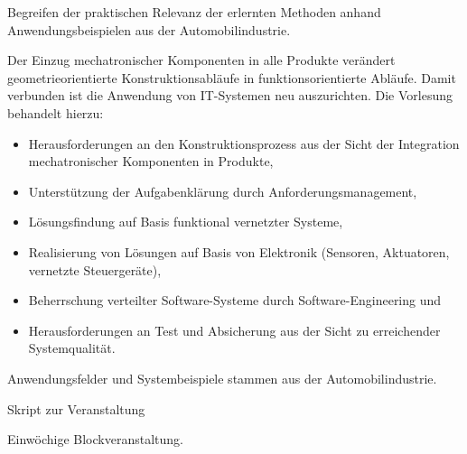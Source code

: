 \begin{course}
\begin{learningoutcomes}
 

Begreifen der praktischen Relevanz der erlernten Methoden anhand Anwendungsbeispielen aus der Automobilindustrie.


\end{learningoutcomes}

\begin{content}
Der Einzug mechatronischer Komponenten in alle Produkte verändert geometrieorientierte Konstruktionsabläufe in funktionsorientierte Abläufe. Damit verbunden ist die Anwendung von IT-Systemen neu auszurichten. Die Vorlesung behandelt hierzu:

 \begin{itemize}\item Herausforderungen an den Konstruktionsprozess aus der Sicht der Integration mechatronischer Komponenten in Produkte,  \item Unterstützung der Aufgabenklärung durch Anforderungsmanagement,  \item Lösungsfindung auf Basis funktional vernetzter Systeme,  \item Realisierung von Lösungen auf Basis von Elektronik (Sensoren, Aktuatoren, vernetzte Steuergeräte),  \item Beherrschung verteilter Software-Systeme durch Software-Engineering und  \item Herausforderungen an Test und Absicherung aus der Sicht zu erreichender Systemqualität.  \end{itemize}

Anwendungsfelder und Systembeispiele stammen aus der Automobilindustrie.


\end{content}

\begin{media}Skript zur Veranstaltung

\end{media}



\begin{remarks}Einwöchige Blockveranstaltung.

\end{remarks}

\end{course}